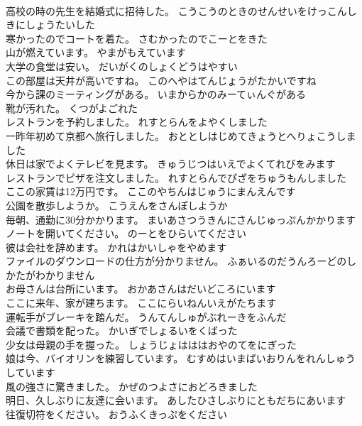 \documentclass[8pt]{extreport}
\begin{document}
\begin{CJK}{UTF8}{min}
\\	高校の時の先生を結婚式に招待した。	こうこうのときのせんせいをけっこんしきにしょうたいした 
\\	寒かったのでコートを着た。	さむかったのでこーとをきた 
\\	山が燃えています。	やまがもえています 
\\	大学の食堂は安い。	だいがくのしょくどうはやすい 
\\	この部屋は天井が高いですね。	このへやはてんじょうがたかいですね 
\\	今から課のミーティングがある。	いまからかのみーてぃんぐがある 
\\	靴が汚れた。	くつがよごれた 
\\	レストランを予約しました。	れすとらんをよやくしました 
\\	一昨年初めて京都へ旅行しました。	おととしはじめてきょうとへりょこうしました 
\\	休日は家でよくテレビを見ます。	きゅうじつはいえでよくてれびをみます 
\\	レストランでピザを注文しました。	れすとらんでぴざをちゅうもんしました 
\\	ここの家賃は12万円です。	ここのやちんはじゅうにまんえんです 
\\	公園を散歩しようか。	こうえんをさんぽしようか 
\\	毎朝、通勤に30分かかります。	まいあさつうきんにさんじゅっぷんかかります 
\\	ノートを開いてください。	のーとをひらいてください 
\\	彼は会社を辞めます。	かれはかいしゃをやめます 
\\	ファイルのダウンロードの仕方が分かりません。	ふぁいるのだうんろーどのしかたがわかりません 
\\	お母さんは台所にいます。	おかあさんはだいどころにいます 
\\	ここに来年、家が建ちます。	ここにらいねんいえがたちます 
\\	運転手がブレーキを踏んだ。	うんてんしゅがぶれーきをふんだ 
\\	会議で書類を配った。	かいぎでしょるいをくばった 
\\	少女は母親の手を握った。	しょうじょはははおやのてをにぎった 
\\	娘は今、バイオリンを練習しています。	むすめはいまばいおりんをれんしゅうしています 
\\	風の強さに驚きました。	かぜのつよさにおどろきました 
\\	明日、久しぶりに友達に会います。	あしたひさしぶりにともだちにあいます 
\\	往復切符をください。	おうふくきっぷをください 

\end{CJK}
\end{document}
